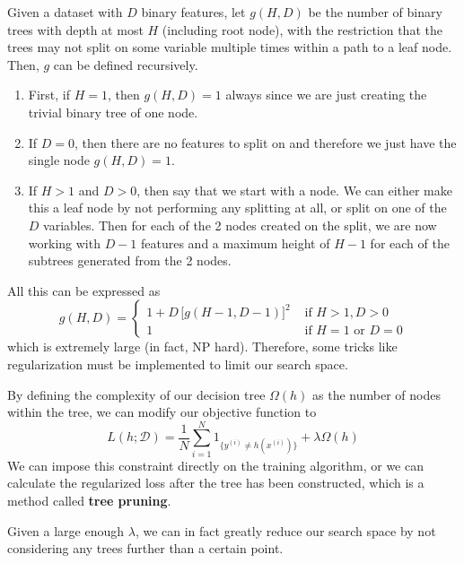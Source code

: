 \documentclass{article}
\theoremstyle{definition}
\begin{document}
  Given a dataset with $D$ binary features, let $g(H, D)$ be the number of binary trees with depth at most $H$ (including root node), with the restriction that the trees may not split on some variable multiple times within a path to a leaf node. Then, $g$ can be defined recursively. 
  \begin{enumerate}
      \item First, if $H = 1$, then $g(H, D) = 1$ always since we are just creating the trivial binary tree of one node. 
      \item If $D = 0$, then there are no features to split on and therefore we just have the single node $g(H, D) = 1$. 
      \item If $H > 1$ and $D > 0$, then say that we start with a node. We can either make this a leaf node by not performing any splitting at all, or split on one of the $D$ variables. Then for each of the 2 nodes created on the split, we are now working with $D-1$ features and a maximum height of $H-1$ for each of the subtrees generated from the 2 nodes. 
  \end{enumerate}
  All this can be expressed as 
  \[g(H, D) = \begin{cases} 1 + D \, \big[ g(H - 1, D - 1) \big]^2 & \text{ if } H > 1, D > 0 \\ 1 & \text{ if } H = 1 \text{ or } D = 0 \end{cases} \]
  which is extremely large (in fact, NP hard). Therefore, some tricks like regularization must be implemented to limit our search space. 

  By defining the complexity of our decision tree $\Omega(h)$ as the number of nodes within the tree, we can modify our objective function to 
  \[L(h; \mathcal{D}) = \frac{1}{N} \sum_{i=1}^N 1_{\{y^{(i)} \neq h(x^{(i)})\}} + \lambda \Omega(h)\]
  We can impose this constraint directly on the training algorithm, or we can calculate the regularized loss after the tree has been constructed, which is a method called \textbf{tree pruning}. 

  Given a large enough $\lambda$, we can in fact greatly reduce our search space by not considering any trees further than a certain point. 
\end{document}

